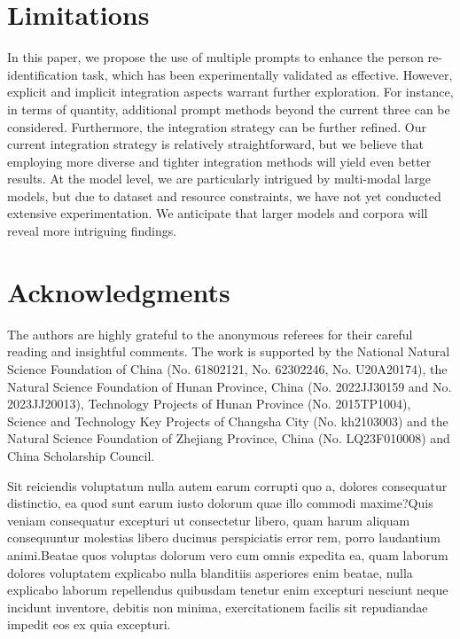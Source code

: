 \documentclass[letterpaper]{article} %
\begin{document}
\section*{Limitations}
In this paper, we propose the use of multiple prompts to enhance the person re-identification task, which has been experimentally validated as effective. However, explicit and implicit integration aspects warrant further exploration. For instance, in terms of quantity, additional prompt methods beyond the current three can be considered. Furthermore, the integration strategy can be further refined. Our current integration strategy is relatively straightforward, but we believe that employing more diverse and tighter integration methods will yield even better results. At the model level, we are particularly intrigued by multi-modal large models, but due to dataset and resource constraints, we have not yet conducted extensive experimentation. We anticipate that larger models and corpora will reveal more intriguing findings.

\section{Acknowledgments}
The authors are highly grateful to the anonymous referees for their careful reading and insightful comments. The work is supported by the National Natural Science Foundation of China (No. 61802121, No. 62302246, No. U20A20174), the Natural Science Foundation of Hunan Province, China (No. 2022JJ30159 and No. 2023JJ20013), Technology Projects of Hunan Province (No. 2015TP1004), Science and Technology Key Projects of Changsha City (No. kh2103003) and the Natural Science Foundation of Zhejiang Province, China (No. LQ23F010008) and China Scholarship Council.

\bigskip

Sit reiciendis voluptatum nulla autem earum corrupti quo a, dolores consequatur distinctio, ea quod sunt earum iusto dolorum quae illo commodi maxime?Quis veniam consequatur excepturi ut consectetur libero, quam harum aliquam consequuntur molestias libero ducimus perspiciatis error rem, porro laudantium animi.Beatae quos voluptas dolorum vero cum omnis expedita ea, quam laborum dolores voluptatem explicabo nulla blanditiis asperiores enim beatae, nulla explicabo laborum repellendus quibusdam tenetur enim excepturi nesciunt neque incidunt inventore, debitis non minima, exercitationem facilis sit repudiandae impedit eos ex quia excepturi.\clearpage

\end{document}
